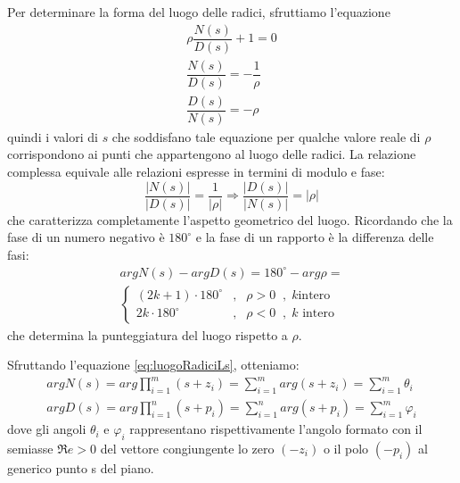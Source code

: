 \documentclass[a4paper]{report}
\begin{document}
Per determinare la forma del luogo delle radici, sfruttiamo
l'equazione
\[
\begin{array}{l}
  \rho \dfrac{N(s)}{D(s)} + 1 = 0\\
  \dfrac{N(s)}{D(s)} = - \dfrac{1}{\rho}\\
  \dfrac{D(s)}{N(s)} = - \rho
\end{array}
\]
quindi i valori di $s$ che soddisfano tale equazione per qualche
valore reale di $\rho$ corrispondono ai punti che appartengono al
luogo delle radici. La relazione complessa equivale alle relazioni
espresse in termini di modulo e fase:
\begin{equation}\label{eq:luogoRadiciModulo}
  \dfrac{|N(s)|}{|D(s)|} = \dfrac{1}{|\rho|} \Rightarrow
  \dfrac{|D(s)|}{|N(s)|} = |\rho|
\end{equation}
che caratterizza completamente l'aspetto geometrico del
luogo. Ricordando che la fase di un numero negativo \`e $180^{\circ}$
e la fase di un rapporto \`e la differenza delle fasi:
\begin{equation}\label{eq:luogoRadiciFasi}
  \begin{array}{l}
    arg N(s) - arg D(s) = 180^{\circ} - arg \rho = \\
    \left \{
    \begin{array}{lcl}
      (2k + 1)\cdot 180^{\circ} &,& \rho > 0 \;\;,\; k \textrm{
        intero}\\
      2k \cdot 180^{\circ} &,& \rho < 0 \;\;,\; k \textrm{ intero}
    \end{array}
    \right .
  \end{array}
\end{equation}
che determina la punteggiatura del luogo rispetto a $\rho$.

Sfruttando l'equazione \ref{eq:luogoRadiciLs}, otteniamo:
\begin{equation}
  \begin{array}{l}
    arg N(s) = arg \prod\limits_{i = 1}^{m} (s + z_i) = \sum_{i =
      1}^{m} arg (s + z_i) = \sum_{i = 1}^{m}\theta_i\\
    arg D(s) = arg \prod\limits_{i = 1}^{n} (s + p_i) = \sum_{i =
      1}^{n} arg (s + p_i) = \sum_{i = 1}^{m}\varphi_i
  \end{array}
\end{equation}
dove gli angoli $\theta_i$ e $\varphi_i$ rappresentano rispettivamente
l'angolo formato con il semiasse $\mathfrak{R}e > 0$ del vettore
congiungente lo zero $(-z_i)$ o il polo $(-p_i)$ al generico punto s
del piano.
\end{document}
